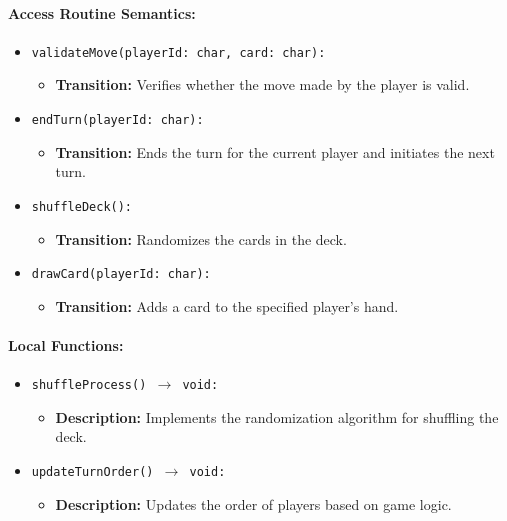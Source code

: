 \documentclass[12pt, titlepage]{article}
\begin{document}
\paragraph{Access Routine Semantics:}
\begin{itemize}
    \item \texttt{validateMove(playerId: char, card: char):}
    \begin{itemize}
        \item \textbf{Transition:} Verifies whether the move made by the player is valid.
    \end{itemize}
    \item \texttt{endTurn(playerId: char):}
    \begin{itemize}
        \item \textbf{Transition:} Ends the turn for the current player and initiates the next turn.
    \end{itemize}
    \item \texttt{shuffleDeck():}
    \begin{itemize}
        \item \textbf{Transition:} Randomizes the cards in the deck.
    \end{itemize}
    \item \texttt{drawCard(playerId: char):}
    \begin{itemize}
        \item \textbf{Transition:} Adds a card to the specified player's hand.
    \end{itemize}
\end{itemize}

\paragraph{Local Functions:}
\begin{itemize}
    \item \texttt{shuffleProcess() $\to$ void:}
    \begin{itemize}
        \item \textbf{Description:} Implements the randomization algorithm for shuffling the deck.
    \end{itemize}
    \item \texttt{updateTurnOrder() $\to$ void:}
    \begin{itemize}
        \item \textbf{Description:} Updates the order of players based on game logic.
    \end{itemize}
\end{itemize}
\end{document}

